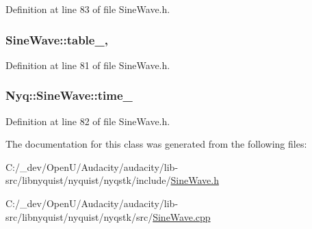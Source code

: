 Definition at line 83 of file Sine\+Wave.\+h.

\subsubsection[{\texorpdfstring{table\+\_\+}{table_}}]{ Sine\+Wave\+::table\+\_\+\hspace{0.3cm}{\ttfamily [static]}, {\ttfamily [protected]}}\hypertarget{class_nyq_1_1_sine_wave_a52246f50ef288f1bcef5ae4c4c9e993a}{}\label{class_nyq_1_1_sine_wave_a52246f50ef288f1bcef5ae4c4c9e993a}


Definition at line 81 of file Sine\+Wave.\+h.

\subsubsection[{\texorpdfstring{time\+\_\+}{time_}}]{ Nyq\+::\+Sine\+Wave\+::time\+\_\+\hspace{0.3cm}{\ttfamily [protected]}}\hypertarget{class_nyq_1_1_sine_wave_a43486be00e4b7cb653b37c2611a8dd46}{}\label{class_nyq_1_1_sine_wave_a43486be00e4b7cb653b37c2611a8dd46}


Definition at line 82 of file Sine\+Wave.\+h.



The documentation for this class was generated from the following files\+:\begin{DoxyCompactItemize}
\item 
C\+:/\+\_\+dev/\+Open\+U/\+Audacity/audacity/lib-\/src/libnyquist/nyquist/nyqstk/include/\hyperlink{_sine_wave_8h}{Sine\+Wave.\+h}\item 
C\+:/\+\_\+dev/\+Open\+U/\+Audacity/audacity/lib-\/src/libnyquist/nyquist/nyqstk/src/\hyperlink{_sine_wave_8cpp}{Sine\+Wave.\+cpp}\end{DoxyCompactItemize}
